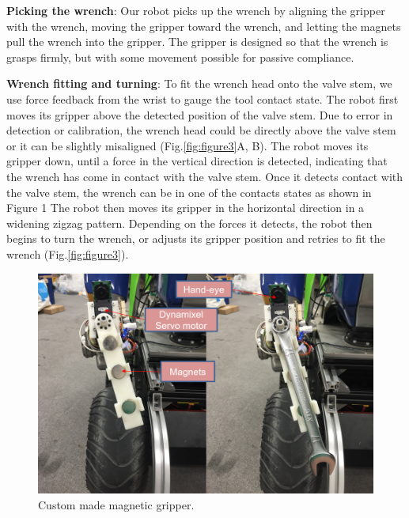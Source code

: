 \documentclass{standalone}
\begin{document}
\textbf{Picking the wrench}: Our robot picks up the wrench by aligning the gripper with the wrench, moving the gripper toward the wrench, and letting the magnets pull the wrench into the gripper. The gripper is designed so that the wrench is grasps firmly, but with some movement possible for passive compliance.

\textbf{Wrench fitting and turning}: To fit the wrench head onto the valve stem, we use force feedback from the wrist to gauge the tool contact state. The robot first moves its gripper above the detected position of the valve stem. Due to error in detection or calibration, the wrench head could be directly above the valve stem or it can be slightly misaligned (Fig.\ref{fig:figure3}A, B). The robot moves its gripper down, until a force in the vertical direction is detected, indicating that the wrench has come in contact with the valve stem. Once it detects contact with the valve stem, the wrench can be in one of the contacts states as shown in Figure 1 The robot then moves its gripper in the horizontal direction in a widening zigzag pattern. Depending on the forces it detects, the robot then begins to turn the wrench, or adjusts its gripper position and retries to fit the wrench (Fig.\ref{fig:figure3}).

\begin{figure}
  \includegraphics[width=\columnwidth]{sections/task2/images/gripper}
  \caption{Custom made magnetic gripper.}
  \label{fig:figure2}
\end{figure}
\end{document}
